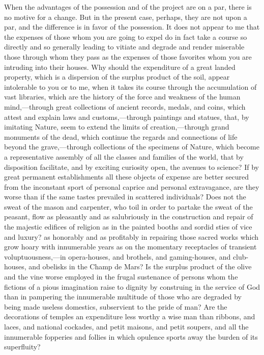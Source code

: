 When the advantages of the possession and of the project are on a par, there is no motive for a change. But in the present case, perhaps, they are not upon a par, and the difference is in favor of the possession. It does not appear to me that the expenses of those whom you are going to expel do in fact take a course so directly and so generally leading to vitiate and degrade and render miserable those through whom they pass as the expenses of those favorites whom you are intruding into their houses. Why should the expenditure of a great landed property, which is a dispersion of the surplus product of the soil, appear intolerable to you or to me, when it takes its course through the accumulation of vast libraries, which are the history of the force and weakness of the human mind,—through great collections of ancient records, medals, and coins, which attest and explain laws and customs,—through paintings and statues, that, by imitating Nature, seem to extend the limits of creation,—through grand monuments of the dead, which continue the regards and connections of life beyond the grave,—through collections of the specimens of Nature, which become a representative assembly of all the classes and families of the world, that by disposition facilitate, and by exciting curiosity open, the avenues to science? If by great permanent establishments all these objects of expense are better secured from the inconstant sport of personal caprice and personal extravagance, are they worse than if the same tastes prevailed in scattered individuals? Does not the sweat of the mason and carpenter, who toil in order to partake the sweat of the peasant, flow as pleasantly and as salubriously in the construction and repair of the majestic edifices of religion as in the painted booths and sordid sties of vice and luxury? as honorably and as profitably in repairing those sacred works which grow hoary with innumerable years as on the momentary receptacles of transient voluptuousness,—in opera-houses, and brothels, and gaming-houses, and club-houses, and obelisks in the Champ de Mars? Is the surplus product of the olive and the vine worse employed in the frugal sustenance of persons whom the fictions of a pious imagination raise to dignity by construing in the service of God than in pampering the innumerable multitude of those who are degraded by being made useless domestics, subservient to the pride of man? Are the decorations of temples an expenditure less worthy a wise man than ribbons, and laces, and national cockades, and petit maisons, and petit soupers, and all the innumerable fopperies and follies in which opulence sports away the burden of its superfluity?

